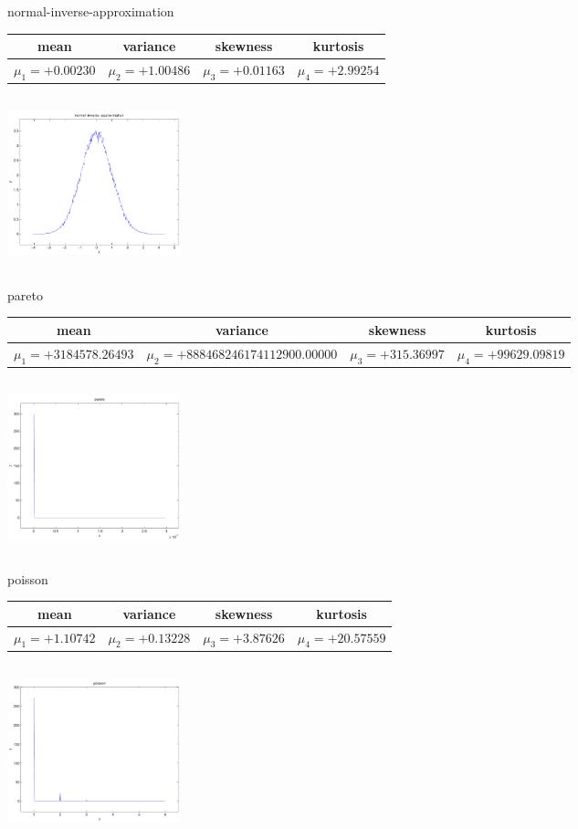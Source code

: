 \documentclass[9pt]{article}
\theoremstyle{plain}
\theoremstyle{definition}
\theoremstyle{remark}
\numberwithin{equation}{section}
\begin{document}
\newpage
normal-inverse-approximation \begin{tabular}{|c|c|c|c|}  mean & variance & skewness & kurtosis \\  \hline
$\mu_1 = +0.00230$ & $\mu_2 = +1.00486$ & $\mu_3 = +0.01163$ & $\mu_4 =+2.99254$ \\
\end{tabular}

\includegraphics[width=5cm,height=5cm]{normal-inverse-approximation.pdf}

pareto \begin{tabular}{|c|c|c|c|}  mean & variance & skewness & kurtosis \\  \hline
$\mu_1 = +3184578.26493$ & $\mu_2 = +888468246174112900.00000$ & $\mu_3 = +315.36997$ & $\mu_4 =+99629.09819$ \\
\end{tabular}

\includegraphics[width=5cm,height=5cm]{pareto.pdf}

poisson \begin{tabular}{|c|c|c|c|}  mean & variance & skewness & kurtosis \\  \hline
$\mu_1 = +1.10742$ & $\mu_2 = +0.13228$ & $\mu_3 = +3.87626$ & $\mu_4 =+20.57559$ \\
\end{tabular}

\includegraphics[width=5cm,height=5cm]{poisson.pdf}
\end{document}
